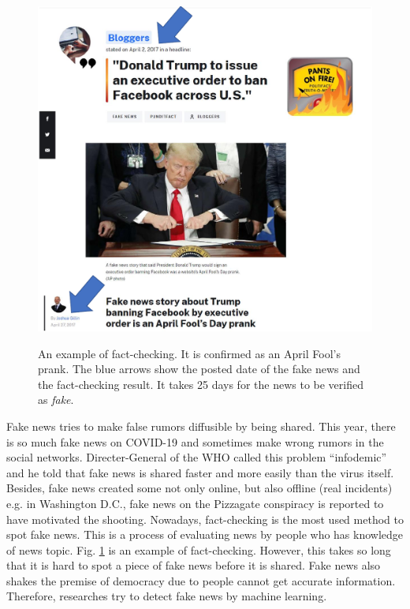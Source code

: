 \documentclass[conference]{IEEEtran}
\begin{document}
\begin{figure}[!t]
    \centering
    \includegraphics[width=\linewidth]{fact-check.pdf}
    \label{fig:example}
    \caption{
        An example of fact-checking. It is confirmed as an April Fool's prank.
        The blue arrows show the posted date of the fake news and the fact-checking result.
        It takes 25 days for the news to be verified as \textit{fake}.
        }
\end{figure}


Fake news tries to make false rumors diffusible by being shared.
This year, there is so much fake news on COVID-19 and sometimes make wrong rumors in the social networks.
Directer-General of the WHO called this problem ``infodemic'' and he told that fake news is shared faster and more easily than the virus itself\cite{ZAROCOSTAS2020676}. 
Besides, fake news created some not only online, but also offline (real incidents)
e.g. in Washington D.C., fake news on the Pizzagate conspiracy is reported to have motivated the shooting\cite{agencies_2016}.
Nowadays, fact-checking is the most used method to spot fake news.
This is a process of evaluating news by people who has knowledge of news topic.
Fig. \ref{fig:example} is an example of fact-checking\cite{gillin_2017}.
However, this takes so long that it is hard to spot a piece of fake news before it is shared.
Fake news also shakes the premise of democracy due to people cannot get accurate information.
Therefore, researches try to detect fake news by machine learning.
\end{document}
